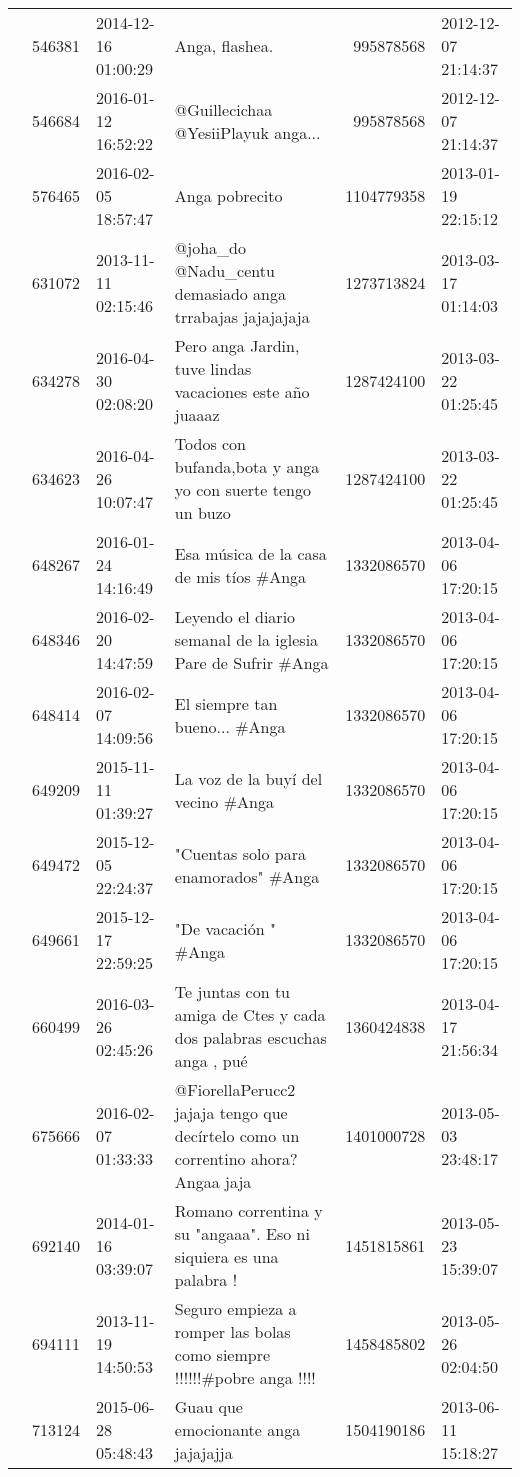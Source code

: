 \begin{tabular}{llllrl}
 & 546381& 2014-12-16 01:00:29 & Anga, flashea. & 995878568 & 2012-12-07 21:14:37 \\
 & 546684& 2016-01-12 16:52:22 & @Guillecichaa @YesiiPlayuk anga... & 995878568 & 2012-12-07 21:14:37 \\
 & 576465& 2016-02-05 18:57:47 & Anga pobrecito &1104779358 & 2013-01-19 22:15:12 \\
 & 631072& 2013-11-11 02:15:46 & @joha\_do @Nadu\_centu demasiado anga trrabajas jajajajaja &1273713824 & 2013-03-17 01:14:03 \\
 & 634278& 2016-04-30 02:08:20 & Pero anga Jardin, tuve lindas vacaciones este año juaaaz &1287424100 & 2013-03-22 01:25:45 \\
 & 634623& 2016-04-26 10:07:47 &Todos con bufanda,bota y anga yo con suerte tengo un buzo &1287424100 & 2013-03-22 01:25:45 \\
 & 648267& 2016-01-24 14:16:49 &Esa música de la casa de mis tíos \#Anga &1332086570 & 2013-04-06 17:20:15 \\
 & 648346& 2016-02-20 14:47:59 & Leyendo el diario semanal de la iglesia Pare de Sufrir \#Anga &1332086570 & 2013-04-06 17:20:15 \\
 & 648414& 2016-02-07 14:09:56 &El siempre tan bueno... \#Anga &1332086570 & 2013-04-06 17:20:15 \\
 & 649209& 2015-11-11 01:39:27 & La voz de la buyí del vecino \#Anga &1332086570 & 2013-04-06 17:20:15 \\
 & 649472& 2015-12-05 22:24:37 & "Cuentas solo para enamorados" \#Anga &1332086570 & 2013-04-06 17:20:15 \\
 & 649661& 2015-12-17 22:59:25 & "De vacación " \#Anga &1332086570 & 2013-04-06 17:20:15 \\
 & 660499& 2016-03-26 02:45:26 & Te juntas con tu amiga de Ctes y cada dos palabras escuchas anga , pué &1360424838 & 2013-04-17 21:56:34 \\
 & 675666& 2016-02-07 01:33:33 & @FiorellaPerucc2 jajaja tengo que decírtelo como un correntino ahora? Angaa jaja &1401000728 & 2013-05-03 23:48:17 \\
 & 692140& 2014-01-16 03:39:07 &Romano correntina y su "angaaa". Eso ni siquiera es una palabra ! &1451815861 & 2013-05-23 15:39:07 \\
 & 694111& 2013-11-19 14:50:53 &Seguro empieza a romper las bolas como siempre !!!!!!\#pobre anga !!!! &1458485802 & 2013-05-26 02:04:50 \\
 & 713124& 2015-06-28 05:48:43 &Guau que emocionante anga jajajajja &1504190186 & 2013-06-11 15:18:27 \\

\end{tabular}
